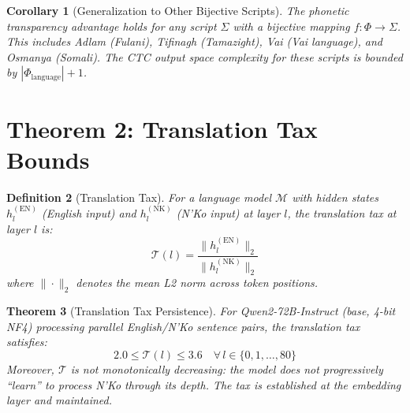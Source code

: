 \documentclass[11pt]{article}
\newtheorem{theorem}{Theorem}
\newtheorem{corollary}[theorem]{Corollary}
\newtheorem{definition}[theorem]{Definition}
\theoremstyle{remark}
\begin{document}
\begin{corollary}[Generalization to Other Bijective Scripts]
The phonetic transparency advantage holds for any script $\Sigma$ with a bijective mapping $f: \Phi \to \Sigma$. This includes Adlam (Fulani), Tifinagh (Tamazight), Vai (Vai language), and Osmanya (Somali). The CTC output space complexity for these scripts is bounded by $|\Phi_{\text{language}}| + 1$.
\end{corollary}

\section{Theorem 2: Translation Tax Bounds}

\begin{definition}[Translation Tax]
For a language model $\mathcal{M}$ with hidden states $h_l^{(\text{EN})}$ (English input) and $h_l^{(\text{NK})}$ (N'Ko input) at layer $l$, the translation tax at layer $l$ is:
\begin{equation}
\mathcal{T}(l) = \frac{\|h_l^{(\text{EN})}\|_2}{\|h_l^{(\text{NK})}\|_2}
\end{equation}
where $\|\cdot\|_2$ denotes the mean L2 norm across token positions.
\end{definition}

\begin{theorem}[Translation Tax Persistence]
For Qwen2-72B-Instruct (base, 4-bit NF4) processing parallel English/N'Ko sentence pairs, the translation tax satisfies:
$$2.0 \leq \mathcal{T}(l) \leq 3.6 \quad \forall\, l \in \{0, 1, \ldots, 80\}$$
Moreover, $\mathcal{T}$ is not monotonically decreasing: the model does not progressively ``learn'' to process N'Ko through its depth. The tax is established at the embedding layer and maintained.
\end{theorem}
\end{document}
